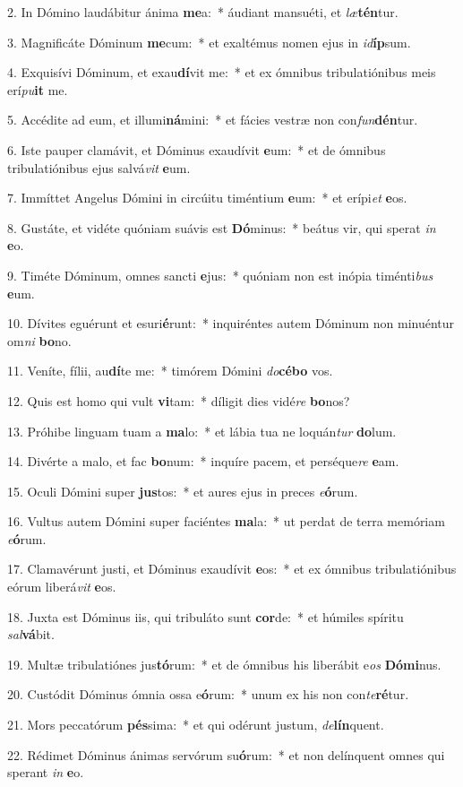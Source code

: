 2. In Dómino laudábitur ánima \textbf{me}a:~*  áudiant mansuéti, et \textit{læ}\textbf{tén}tur.\

3. Magnificáte Dóminum \textbf{me}cum:~*  et exaltémus nomen ejus in \textit{id}\textbf{íp}sum.\

4. Exquisívi Dóminum, et exau\textbf{dí}vit me:~*  et ex ómnibus tribulatiónibus meis erí\textit{pu}\textbf{it} me.\

5. Accédite ad eum, et illumi\textbf{ná}mini:~*  et fácies vestræ non con\textit{fun}\textbf{dén}tur.\

6. Iste pauper clamávit, et Dóminus exaudívit \textbf{e}um:~*  et de ómnibus tribulatiónibus ejus salvá\textit{vit} \textbf{e}um.\

7. Immíttet Angelus Dómini in circúitu timéntium \textbf{e}um:~*  et erípi\textit{et} \textbf{e}os.\

8. Gustáte, et vidéte quóniam suávis est \textbf{Dó}minus:~*  beátus vir, qui sperat \textit{in} \textbf{e}o.\

9. Timéte Dóminum, omnes sancti \textbf{e}jus:~*  quóniam non est inópia timénti\textit{bus} \textbf{e}um.\

10. Dívites eguérunt et esuri\textbf{é}runt:~*  inquiréntes autem Dóminum non minuéntur om\textit{ni} \textbf{bo}no.\

11. Veníte, fílii, au\textbf{dí}te me:~*  timórem Dómini \textit{do}\textbf{cé}\textbf{bo} vos.\

12. Quis est homo qui vult \textbf{vi}tam:~*  díligit dies vidé\textit{re} \textbf{bo}nos?\

13. Próhibe linguam tuam a \textbf{ma}lo:~*  et lábia tua ne loquán\textit{tur} \textbf{do}lum.\

14. Divérte a malo, et fac \textbf{bo}num:~*  inquíre pacem, et perséque\textit{re} \textbf{e}am.\

15. Oculi Dómini super \textbf{jus}tos:~*  et aures ejus in preces \textit{e}\textbf{ó}rum.\

16. Vultus autem Dómini super faciéntes \textbf{ma}la:~*  ut perdat de terra memóriam \textit{e}\textbf{ó}rum.\

17. Clamavérunt justi, et Dóminus exaudívit \textbf{e}os:~*  et ex ómnibus tribulatiónibus eórum liberá\textit{vit} \textbf{e}os.\

18. Juxta est Dóminus iis, qui tribuláto sunt \textbf{cor}de:~*  et húmiles spíritu \textit{sal}\textbf{vá}bit.\

19. Multæ tribulatiónes jus\textbf{tó}rum:~*  et de ómnibus his liberábit e\textit{os} \textbf{Dó}\textbf{mi}nus.\

20. Custódit Dóminus ómnia ossa e\textbf{ó}rum:~*  unum ex his non con\textit{te}\textbf{ré}tur.\

21. Mors peccatórum \textbf{pés}sima:~*  et qui odérunt justum, \textit{de}\textbf{lín}quent.\

22. Rédimet Dóminus ánimas servórum su\textbf{ó}rum:~*  et non delínquent omnes qui sperant \textit{in} \textbf{e}o.\

